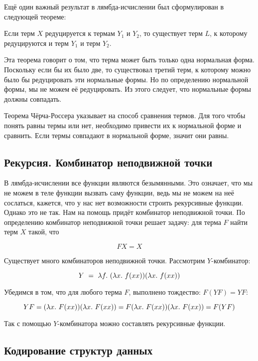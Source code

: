 Ещё один важный результат в лямбда-исчислении был
сформулирован в следующей теореме:

\begin{Ltheorem}
Если терм $X$ редуцируется к термам $Y_1$ и $Y_2$, то 
существует терм $L$, к которому редуцируются и терм $Y_1$
и терм $Y_2$.
\end{Ltheorem}

Эта теорема говорит о том, что терма может быть только
одна нормальная форма. Поскольку если бы их было две, то 
существовал третий терм, к которому можно было бы редуцировать
эти нормальные формы. Но по определению нормальной формы, мы
не можем её редуцировать. Из этого следует, что нормальные формы
должны совпадать.

Теорема Чёрча-Россера указывает на способ сравнения термов.
Для того чтобы понять равны термы или нет, необходимо привести
их к нормальной форме и сравнить. Если термы совпадают в 
нормальной форме, значит они равны.


\subsection{Рекурсия. Комбинатор неподвижной точки}

В лямбда-исчислении все функции являются безымянными. 
Это означает, что мы не можем в теле функции вызвать 
саму функции, ведь мы не можем на неё сослаться, кажется, что 
у нас нет возможности строить рекурсивные функции.
Однако это не так. Нам на помощь придёт комбинатор неподвижной
точки. По определению комбинатор неподвижной точки решает 
задачу: для терма $F$ найти терм $X$ такой, что

\[ F X = X \]

Существует много комбинаторов неподвижной точки. 
Рассмотрим $Y$-комбинатор:

\[ Y\ =\ \lambda f .\  (\lambda x .\  f(xx)) (\lambda x .\  f(xx))   \]

Убедимся в том, что для любого терма $F$, выполнено тождество:
$F(YF) = YF$:

\[ YF = (\lambda x .\  F(xx)) (\lambda x .\  F(xx)) = 
   F (\lambda x .\  F(xx)) (\lambda x .\  F(xx)) = F(YF) \]

Так с помощью $Y$-комбинатора можно составлять рекурсивные функции.

\subsection{Кодирование структур данных}


